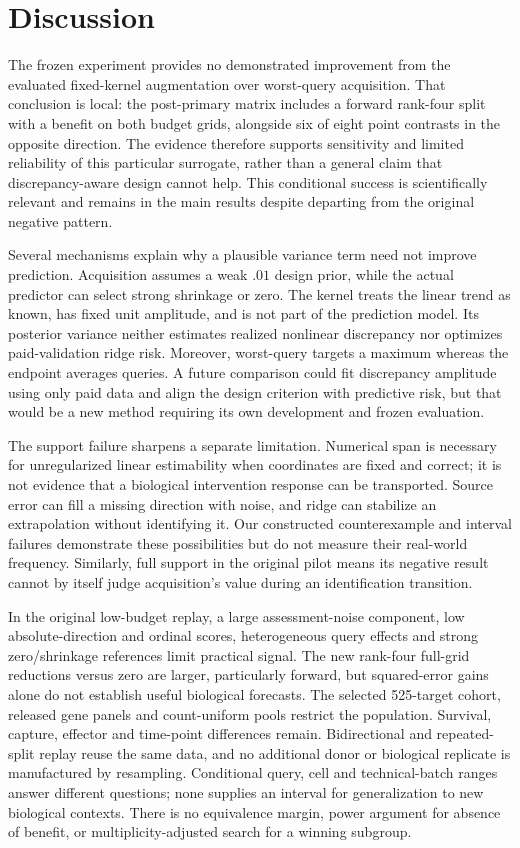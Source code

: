 \section{Discussion}
The frozen experiment provides no demonstrated improvement from the evaluated fixed-kernel augmentation over worst-query acquisition. That conclusion is local: the post-primary matrix includes a forward rank-four split with a benefit on both budget grids, alongside six of eight point contrasts in the opposite direction. The evidence therefore supports sensitivity and limited reliability of this particular surrogate, rather than a general claim that discrepancy-aware design cannot help. This conditional success is scientifically relevant and remains in the main results despite departing from the original negative pattern.

Several mechanisms explain why a plausible variance term need not improve prediction. Acquisition assumes a weak $.01$ design prior, while the actual predictor can select strong shrinkage or zero. The kernel treats the linear trend as known, has fixed unit amplitude, and is not part of the prediction model. Its posterior variance neither estimates realized nonlinear discrepancy nor optimizes paid-validation ridge risk. Moreover, worst-query targets a maximum whereas the endpoint averages queries. A future comparison could fit discrepancy amplitude using only paid data and align the design criterion with predictive risk, but that would be a new method requiring its own development and frozen evaluation.

The support failure sharpens a separate limitation. Numerical span is necessary for unregularized linear estimability when coordinates are fixed and correct; it is not evidence that a biological intervention response can be transported. Source error can fill a missing direction with noise, and ridge can stabilize an extrapolation without identifying it. Our constructed counterexample and interval failures demonstrate these possibilities but do not measure their real-world frequency. Similarly, full support in the original pilot means its negative result cannot by itself judge acquisition's value during an identification transition.

In the original low-budget replay, a large assessment-noise component, low absolute-direction and ordinal scores, heterogeneous query effects and strong zero/shrinkage references limit practical signal. The new rank-four full-grid reductions versus zero are larger, particularly forward, but squared-error gains alone do not establish useful biological forecasts. The selected 525-target cohort, released gene panels and count-uniform pools restrict the population. Survival, capture, effector and time-point differences remain. Bidirectional and repeated-split replay reuse the same data, and no additional donor or biological replicate is manufactured by resampling. Conditional query, cell and technical-batch ranges answer different questions; none supplies an interval for generalization to new biological contexts. There is no equivalence margin, power argument for absence of benefit, or multiplicity-adjusted search for a winning subgroup.

